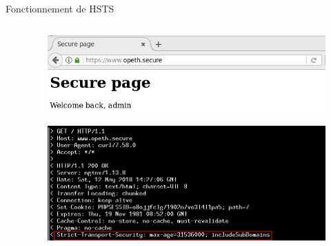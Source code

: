 \begin{frame}{Fonctionnement de HSTS}
\begin{columns}
\begin{column}{0.6\textwidth}
    \end{column}
    \begin{column}{0.4\textwidth}
      \begin{figure}
        \includegraphics[width=\linewidth]{../medias/sslstrip2/screen2.png}
      \end{figure}
      \begin{figure}
        \includegraphics[width=\linewidth]{../medias/hsts.png}
      \end{figure}
    \end{column}
  \end{columns}

\end{frame}


